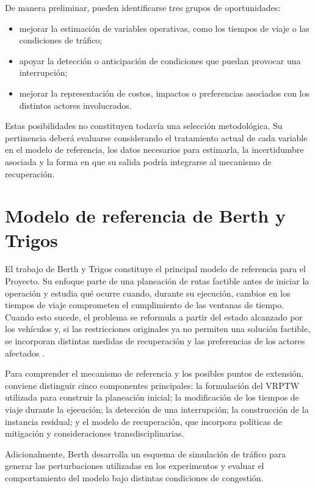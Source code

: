 \documentclass[11pt]{article}
\begin{document}
De manera preliminar, pueden identificarse tres grupos de oportunidades:

\begin{itemize}
    \item mejorar la estimación de variables operativas, como los tiempos de viaje o las condiciones de tráfico;
    \item apoyar la detección o anticipación de condiciones que puedan provocar una interrupción;
    \item mejorar la representación de costos, impactos o preferencias asociados con los distintos actores involucrados.
\end{itemize}

Estas posibilidades no constituyen todavía una selección metodológica. Su pertinencia deberá evaluarse considerando el tratamiento actual de cada variable en el modelo de referencia, los datos necesarios para estimarla, la incertidumbre asociada y la forma en que su salida podría integrarse al mecanismo de recuperación.

\section{Modelo de referencia de Berth y Trigos}

El trabajo de Berth y Trigos constituye el principal modelo de referencia para el
Proyecto. Su enfoque parte de una planeación de rutas factible antes de iniciar la
operación y estudia qué ocurre cuando, durante su ejecución, cambios en los tiempos
de viaje comprometen el cumplimiento de las ventanas de tiempo. Cuando esto sucede,
el problema se reformula a partir del estado alcanzado por los vehículos y, si las
restricciones originales ya no permiten una solución factible, se incorporan distintas
medidas de recuperación y las preferencias de los actores afectados
\parencite{berth_trigos_2025,berth_thesis_2025}.

Para comprender el mecanismo de referencia y los posibles puntos de extensión,
conviene distinguir cinco componentes principales: la formulación del VRPTW utilizada
para construir la planeación inicial; la modificación de los tiempos de viaje durante la
ejecución; la detección de una interrupción; la construcción de la instancia residual; y
el modelo de recuperación, que incorpora políticas de mitigación y consideraciones
transdisciplinarias.

Adicionalmente, Berth desarrolla un esquema de simulación de tráfico para generar las
perturbaciones utilizadas en los experimentos y evaluar el comportamiento del modelo
bajo distintas condiciones de congestión.
\end{document}
